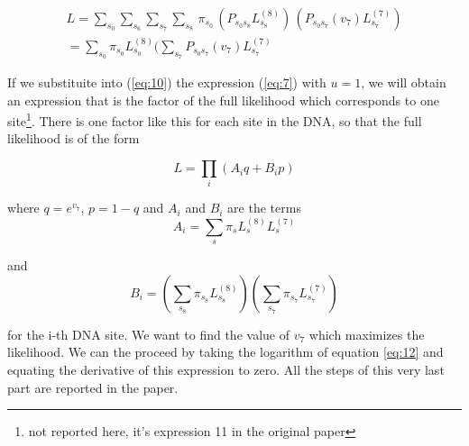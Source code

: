 \begin{align}\label{eq:10}
L = \sum_{s_0} \sum_{s_6} \sum_{s_7} \sum_{s_8} \, \pi_{s_0} \, (P_{s_0 s_8} L_{s_8}^{(8)}) \, (P_{s_0 s_7}(v_7) L_{s_7}^{(7)})
\\
= \sum_{s_0} \pi_{s_0} L_{s_0}^{(8)} ( \sum_{s_7} P_{s_0 s_7}(v_7) L_{s_7}^{(7)}
\end{align}

If we substituite into (\ref{eq:10}) the expression (\ref{eq:7}) with $u=1$, we will obtain an expression that is the factor of the full likelihood which corresponds to one site\footnote{not reported here, it's expression 11 in the original paper}. There is one factor like this for each site in the DNA, so that the full likelihood is of the form

\begin{equation}\label{eq:12}
L = \prod_{i} (A_i q + B_ip)
\end{equation}

where $q= e^{v_7}$, $p= 1-q$ and $A_i$ and $B_i$ are the terms
\begin{equation}
A_i = \sum_{s} \pi_s L_s ^{(8)} L_s ^{(7)}
\end{equation}

and
 \begin{equation}
 B_i = (\sum_{s_8} \pi_{s_8} L_{s_8} ^{(8)}) (\sum_{s_7} \pi_{s_7} L_{s_7} ^{(7)})
 \end{equation}

for the i-th DNA site. We want to find the value of $v_7$ which maximizes the likelihood. We can the proceed by taking the logarithm of equation \ref{eq:12} and equating the derivative of this expression to zero. All the steps of this very last part are reported in the paper.
